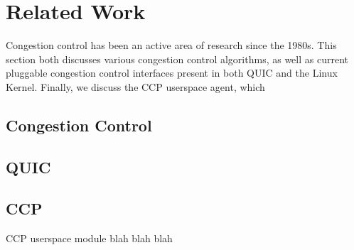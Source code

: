 \chapter{Related Work}
Congestion control has been an active area of research since the 1980s.
This section both discusses various congestion control algorithms, as well as current pluggable congestion control interfaces present in both QUIC and the Linux Kernel.
Finally, we discuss the CCP userspace agent, which 
\section{Congestion Control}

\section{QUIC}

\section{CCP}
CCP userspace module blah blah blah
